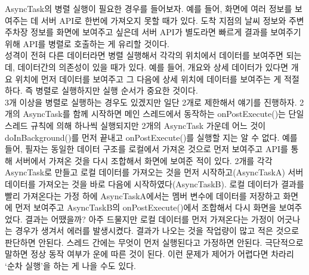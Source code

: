 AsyncTask의 병렬 실행이 필요한 경우를 들어보자. 
예를 들어, 화면에 여러 정보를 보여주는 데 서버 API로 한번에 가져오지 못할 때가 있다. 
도착 지점의 날씨 정보와 주변 주차장 정보를 화면에 보여주고 싶은데 서버 API가 별도라면 빠르게 결과를 보여주기 위해 API를 병렬로 호출하는 게 유리할 것이다.\\

성격이 전혀 다른 데이터라면 병렬 실행해서 각각의 위치에서 데이터를 보여주면 되는데, 데이터간의 의존성이 있을 때가 있다.
예를 들어, 개요와 상세 데이터가 있다면 개요 위치에 먼저 데이터를 보여주고 그 다음에 상세 위치에 데이터를 보여주는 게 적절하다.
즉 병렬로 실행하지만 실행 순서가 중요한 것이다.\\

3개 이상을 병렬로 실행하는 경우도 있겠지만 일단 2개로 제한해서 얘기를 진행하자.
2개의 AsyncTask를 함께 시작하면 메인 스레드에서 동작하는 onPostExecute()는 단일 스레드 규칙에 의해 하나씩 실행되지만
 2개의 AsyncTask 가운데 어느 것이  doInBackground()를 먼저 끝내고 onPostExecute()를 실행할 지는 알 수 없다. 
예를 들어, 필자는 동일한 데이터 구조를 로컬에서 가져온 것으로 먼저 보여주고 API를 통해 서버에서 가져온 것을  다시 조합해서 화면에 보여준 적이 있다.
2개를 각각 AsyncTask로 만들고 로컬 데이터를 가져오는 것을 먼저 시작하고(AsyncTaskA) 서버 데이터를 가져오는 것을 바로 다음에 시작하였다(AsyncTaskB). 
로컬 데이터가 결과를 빨리 가져온다는 가정 하에 AsyncTaskA에서는 멤버 변수에 데이터를 저장하고 화면에 먼저 보여주고 AsyncTaskB의 onPostExecute()에서 조합해서 다시 화면을 보여주었다.
결과는 어땠을까? 아주 드물지만 로컬 데이터를 먼저 가져온다는 가정이 어긋나는 경우가 생겨서 에러를 발생시켰다. 
결과가 나오는 것을 작업량이 많고 적은 것으로 판단하면 안된다.
스레드 간에는 무엇이 먼저 실행된다고 가정하면 안된다. 극단적으로 말하면 정상 동작 여부가 운에 따른 것이 된다.
이런 문제가 제어가 어렵다면 차라리 `순차 실행'을 하는 게 나을 수도 있다.\\

